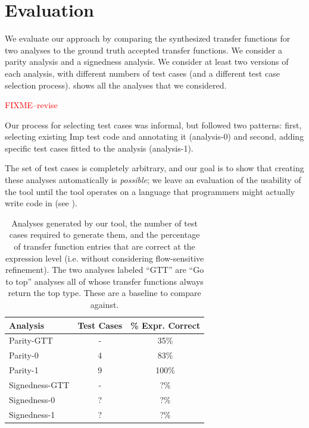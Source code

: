 \documentclass[10pt,conference]{IEEEtran}
\begin{document}
\section{Evaluation}
\label{sec-eval}

We evaluate our approach by comparing the synthesized transfer
functions for two analyses to the ground truth accepted transfer
functions. We consider a parity analysis and a signedness analysis.
We consider at least two versions of each analysis, with different
numbers of test cases (and a different test case selection process).
 shows all the analyses that we considered.

\textcolor{red}{FIXME--revise}

Our process for selecting test cases was informal, but followed two 
patterns:  first, selecting existing Imp test code and annotating it
(analysis-0) and second, adding specific test cases fitted to the analysis (analysis-1).

The set of test cases is completely arbitrary,
and our goal is to show that creating these analyses automatically
is \emph{possible}; we leave an evaluation of the usability of the
tool until the tool operates on a language that programmers might
actually write code in (see ).

\begin{table}
\centering
 \begin{tabular}{l c c }
  Analysis & Test Cases & \% Expr. Correct \\ 
  \midrule
  Parity-GTT & - & 35\% \\
  Parity-0 & 4 & 83\% \\
  Parity-1 & 9 & 100\% \\
  \midrule
  Signedness-GTT & - & ?\% \\
  Signedness-0 & ? & ?\% \\
  Signedness-1 & ? & ?\% \\
 \end{tabular}
 \caption{Analyses generated by our tool, the number of test cases
 required to generate them, and the percentage of transfer function
 entries that are correct at the expression level (i.e. without
 considering flow-sensitive refinement). The two analyses labeled
 ``GTT'' are ``Go to top'' analyses all of whose transfer functions
 always return the top type. These are a baseline to compare against.}
 \label{tab-analyses}
\end{table}
\end{document}
